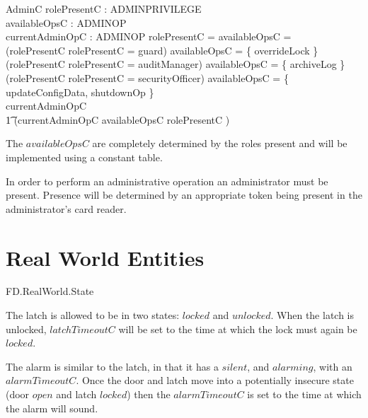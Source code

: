 \begin{schema}{AdminC}
        rolePresentC : \Optional ADMINPRIVILEGE
\\      availableOpsC : \power ADMINOP
\\      currentAdminOpC : \Optional ADMINOP
\where
        rolePresentC = \Nil \implies availableOpsC = \emptyset 
\\      (rolePresentC \neq \Nil \land \The rolePresentC = guard) \implies availableOpsC = 
        \{ overrideLock \}
\\      (rolePresentC \neq \Nil \land \The rolePresentC = auditManager) \implies availableOpsC = 
        \{ archiveLog \}
\\      (rolePresentC \neq \Nil \land \The rolePresentC = securityOfficer) \implies availableOpsC = 
        \{ updateConfigData, shutdownOp \}
\\      currentAdminOpC \neq \Nil \implies 
\\ \t1 (\The currentAdminOpC \in availableOpsC \land rolePresentC \neq \Nil )
\end{schema}
\begin{Zcomment}
\item
The $availableOpsC$ are completely determined by the roles present and
will be implemented using a constant table.
\end{Zcomment}

In order to perform an administrative operation an administrator must
be present. Presence will be determined by an appropriate token being
present in the administrator's card reader.

\section{Real World Entities}

\begin{traceunit}{FD.RealWorld.State}
\end{traceunit}


The latch is allowed to be in two states:
$locked$ and $unlocked$.
When the latch is unlocked,
$latchTimeoutC$ will be set to the time at which the lock must again be $locked$.


The alarm is similar to the latch, 
in that it has a $silent$, and $alarming$,
with an $alarmTimeoutC$.
Once the door and latch move into a potentially insecure state
(door $open$ and latch $locked$)
then the $alarmTimeoutC$ is set to the time at which the alarm will sound.

